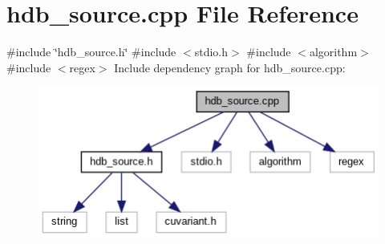 \section{hdb\+\_\+source.\+cpp File Reference}
\label{hdb__source_8cpp}
{\ttfamily \#include \char`\"{}hdb\+\_\+source.\+h\char`\"{}}\newline
{\ttfamily \#include $<$stdio.\+h$>$}\newline
{\ttfamily \#include $<$algorithm$>$}\newline
{\ttfamily \#include $<$regex$>$}\newline
Include dependency graph for hdb\+\_\+source.\+cpp\+:
\nopagebreak
\begin{figure}[H]
\begin{center}
\leavevmode
\includegraphics[width=350pt]{hdb__source_8cpp__incl}
\end{center}
\end{figure}
